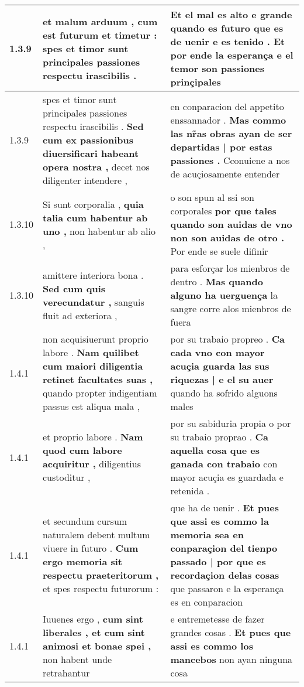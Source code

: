 \begin{tabular}{|p{1cm}|p{6.5cm}|p{6.5cm}|}
1.3.9 & et malum arduum , \textbf{ cum est futurum et timetur : } spes et timor sunt principales passiones respectu irascibilis . & Et el mal es alto e grande \textbf{ quando es futuro que es de uenir e es tenido . } Et por ende la esperança e el temor son passiones prinçipales \\\hline
1.3.9 & spes et timor sunt principales passiones respectu irascibilis . \textbf{ Sed cum ex passionibus diuersificari habeant opera nostra , } decet nos diligenter intendere , & en conparacion del appetito enssannador . \textbf{ Mas commo las nr̃as obras ayan de ser departidas | por estas passiones . } Cconuiene a nos de acuçiosamente entender \\\hline
1.3.10 & Si sunt corporalia , \textbf{ quia talia cum habentur ab uno , } non habentur ab alio , & o son spun al ssi son corporales \textbf{ por que tales quando son auidas de vno non son auidas de otro . } Por ende se suele difinir \\\hline
1.3.10 & amittere interiora bona . \textbf{ Sed cum quis verecundatur , } sanguis fluit ad exteriora , & para esforçar los mienbros de dentro . \textbf{ Mas quando alguno ha uerguença } la sangre corre alos mienbros de fuera \\\hline
1.4.1 & non acquisiuerunt proprio labore . \textbf{ Nam quilibet cum maiori diligentia retinet facultates suas , } quando propter indigentiam passus est aliqua mala , & por su trabaio propreo . \textbf{ Ca cada vno con mayor acuçia guarda las sus riquezas | e el su auer } quando ha sofrido alguons males \\\hline
1.4.1 & et proprio labore . \textbf{ Nam quod cum labore acquiritur , } diligentius custoditur , & por su sabiduria propia o por su trabaio proprao . \textbf{ Ca aquella cosa que es ganada con trabaio } con mayor acuçia es guardada e retenida . \\\hline
1.4.1 & et secundum cursum naturalem debent multum viuere in futuro . \textbf{ Cum ergo memoria sit respectu praeteritorum , } et spes respectu futurorum : & que ha de uenir . \textbf{ Et pues que assi es commo la memoria sea en conparaçion del tienpo passado | por que es recordaçion delas cosas } que passaron e la esperança es en conparacion \\\hline
1.4.1 & Iuuenes ergo , \textbf{ cum sint liberales , et cum sint animosi et bonae spei , } non habent unde retrahantur & e entremetesse de fazer grandes cosas . \textbf{ Et pues que assi es commo los mancebos } non ayan ninguna cosa \\\hline

\end{tabular}
